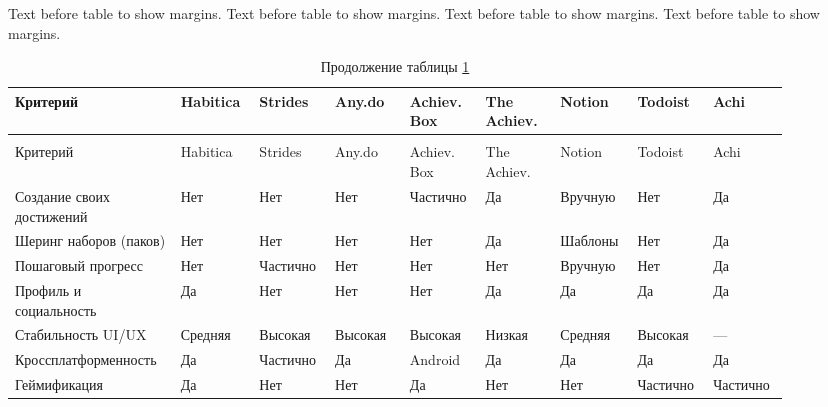 \documentclass[a4paper,14pt]{extarticle}
\begin{document}
\noindent
Text before table to show margins. Text before table to show margins. Text before table to show margins. Text before table to show margins. 

\begingroup
\setlength{\tabcolsep}{2pt}
\footnotesize
\begin{longtable}[t]{
	|>{\RaggedRight\arraybackslash}p{0.18\linewidth}|
	>{\centering\arraybackslash}p{0.09\linewidth}|
	>{\centering\arraybackslash}p{0.09\linewidth}|
	>{\centering\arraybackslash}p{0.09\linewidth}|
	>{\centering\arraybackslash}p{0.09\linewidth}|
	>{\centering\arraybackslash}p{0.09\linewidth}|
	>{\centering\arraybackslash}p{0.09\linewidth}|
	>{\centering\arraybackslash}p{0.09\linewidth}|
	>{\centering\arraybackslash}p{0.09\linewidth}|
}
\caption{Сравнительный анализ аналогов} \label{tab:analogs-compare}\\
\hline
Критерий & Habitica & Strides & Any.do & Achiev. Box & The Achiev. & Notion & Todoist & Achi \\
\hline
\endfirsthead
\caption*{Продолжение таблицы \ref{tab:analogs-compare}}\\
\hline
Критерий & Habitica & Strides & Any.do & Achiev. Box & The Achiev. & Notion & Todoist & Achi \\
\hline
\endhead
\hline
\endfoot
\hline
\endlastfoot
Создание своих достижений & Нет & Нет & Нет & Частично & Да & Вручную & Нет & Да \\
\hline
Шеринг наборов (паков) & Нет & Нет & Нет & Нет & Да & Шаблоны & Нет & Да \\
\hline
Пошаговый прогресс & Нет & Частично & Нет & Нет & Нет & Вручную & Нет & Да \\
\hline
Профиль и социальность & Да & Нет & Нет & Нет & Да & Да & Да & Да \\
\hline
Стабильность UI/UX & Средняя & Высокая & Высокая & Высокая & Низкая & Средняя & Высокая & --- \\
\hline
Кросс\-плат\-фор\-мен\-ность & Да & Частично & Да & Android & Да & Да & Да & Да \\
\hline
Геймификация & Да & Нет & Нет & Да & Нет & Нет & Частично & Частично \\
\end{longtable}
\endgroup
\end{document}
